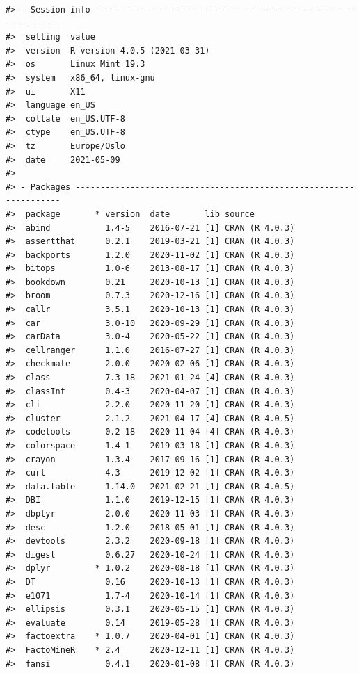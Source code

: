 \documentclass[
]{article}
\begin{document}
\begin{verbatim}
#> - Session info ---------------------------------------------------------------
#>  setting  value                       
#>  version  R version 4.0.5 (2021-03-31)
#>  os       Linux Mint 19.3             
#>  system   x86_64, linux-gnu           
#>  ui       X11                         
#>  language en_US                       
#>  collate  en_US.UTF-8                 
#>  ctype    en_US.UTF-8                 
#>  tz       Europe/Oslo                 
#>  date     2021-05-09                  
#> 
#> - Packages -------------------------------------------------------------------
#>  package       * version  date       lib source        
#>  abind           1.4-5    2016-07-21 [1] CRAN (R 4.0.3)
#>  assertthat      0.2.1    2019-03-21 [1] CRAN (R 4.0.3)
#>  backports       1.2.0    2020-11-02 [1] CRAN (R 4.0.3)
#>  bitops          1.0-6    2013-08-17 [1] CRAN (R 4.0.3)
#>  bookdown        0.21     2020-10-13 [1] CRAN (R 4.0.3)
#>  broom           0.7.3    2020-12-16 [1] CRAN (R 4.0.3)
#>  callr           3.5.1    2020-10-13 [1] CRAN (R 4.0.3)
#>  car             3.0-10   2020-09-29 [1] CRAN (R 4.0.3)
#>  carData         3.0-4    2020-05-22 [1] CRAN (R 4.0.3)
#>  cellranger      1.1.0    2016-07-27 [1] CRAN (R 4.0.3)
#>  checkmate       2.0.0    2020-02-06 [1] CRAN (R 4.0.3)
#>  class           7.3-18   2021-01-24 [4] CRAN (R 4.0.3)
#>  classInt        0.4-3    2020-04-07 [1] CRAN (R 4.0.3)
#>  cli             2.2.0    2020-11-20 [1] CRAN (R 4.0.3)
#>  cluster         2.1.2    2021-04-17 [4] CRAN (R 4.0.5)
#>  codetools       0.2-18   2020-11-04 [4] CRAN (R 4.0.3)
#>  colorspace      1.4-1    2019-03-18 [1] CRAN (R 4.0.3)
#>  crayon          1.3.4    2017-09-16 [1] CRAN (R 4.0.3)
#>  curl            4.3      2019-12-02 [1] CRAN (R 4.0.3)
#>  data.table      1.14.0   2021-02-21 [1] CRAN (R 4.0.5)
#>  DBI             1.1.0    2019-12-15 [1] CRAN (R 4.0.3)
#>  dbplyr          2.0.0    2020-11-03 [1] CRAN (R 4.0.3)
#>  desc            1.2.0    2018-05-01 [1] CRAN (R 4.0.3)
#>  devtools        2.3.2    2020-09-18 [1] CRAN (R 4.0.3)
#>  digest          0.6.27   2020-10-24 [1] CRAN (R 4.0.3)
#>  dplyr         * 1.0.2    2020-08-18 [1] CRAN (R 4.0.3)
#>  DT              0.16     2020-10-13 [1] CRAN (R 4.0.3)
#>  e1071           1.7-4    2020-10-14 [1] CRAN (R 4.0.3)
#>  ellipsis        0.3.1    2020-05-15 [1] CRAN (R 4.0.3)
#>  evaluate        0.14     2019-05-28 [1] CRAN (R 4.0.3)
#>  factoextra    * 1.0.7    2020-04-01 [1] CRAN (R 4.0.3)
#>  FactoMineR    * 2.4      2020-12-11 [1] CRAN (R 4.0.3)
#>  fansi           0.4.1    2020-01-08 [1] CRAN (R 4.0.3)

\end{verbatim}
\end{document}
